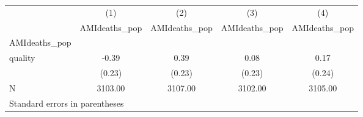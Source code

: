 \begin{tabular}{l*{4}{c}}
\hline\hline
            &\multicolumn{1}{c}{(1)}&\multicolumn{1}{c}{(2)}&\multicolumn{1}{c}{(3)}&\multicolumn{1}{c}{(4)}\\
            &\multicolumn{1}{c}{AMIdeaths\_pop}&\multicolumn{1}{c}{AMIdeaths\_pop}&\multicolumn{1}{c}{AMIdeaths\_pop}&\multicolumn{1}{c}{AMIdeaths\_pop}\\
\hline
AMIdeaths\_pop&            &            &            &            \\
quality     &       -0.39&        0.39&        0.08&        0.17\\
            &      (0.23)&      (0.23)&      (0.23)&      (0.24)\\
\hline
N           &     3103.00&     3107.00&     3102.00&     3105.00\\
\hline\hline
\multicolumn{5}{l}{\footnotesize Standard errors in parentheses}\\
\end{tabular}
